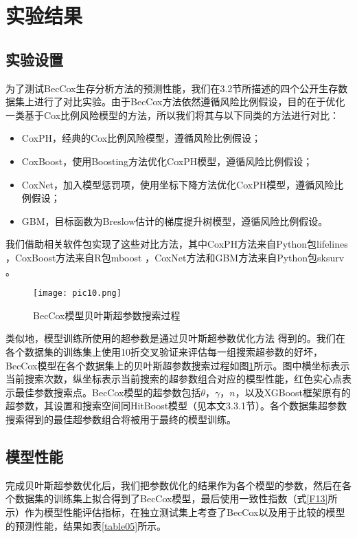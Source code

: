 \section{实验结果}

\subsection{实验设置}

为了测试BecCox生存分析方法的预测性能，我们在3.2节所描述的四个公开生存数据集上进行了对比实验。由于BecCox方法依然遵循风险比例假设，目的在于优化一类基于Cox比例风险模型的方法，所以我们将其与以下同类的方法进行对比：
\begin{itemize}
  \item CoxPH，经典的Cox比例风险模型，遵循风险比例假设；
  \item CoxBoost，使用Boosting方法优化CoxPH模型，遵循风险比例假设；
  \item CoxNet，加入模型惩罚项，使用坐标下降方法优化CoxPH模型，遵循风险比例假设；
  \item GBM，目标函数为Breslow估计的梯度提升树模型，遵循风险比例假设。
\end{itemize}
我们借助相关软件包实现了这些对比方法，其中CoxPH方法来自Python包lifelines ，CoxBoost方法来自R包mboost ，CoxNet方法和GBM方法来自Python包sksurv 。

\begin{figure}[H]
\texttt{[image: pic10.png]}
\caption{BecCox模型贝叶斯超参数搜索过程}
\label{pic10}
\end{figure}

类似地，模型训练所使用的超参数是通过贝叶斯超参数优化方法 得到的。我们在各个数据集的训练集上使用10折交叉验证来评估每一组搜索超参数的好坏，BecCox模型在各个数据集上的贝叶斯超参数搜索过程如图\ref{pic10}所示。图中横坐标表示当前搜索次数，纵坐标表示当前搜索的超参数组合对应的模型性能，红色实心点表示最佳参数搜索点。BecCox模型的超参数包括$\theta$，$\gamma$，$n$，以及XGBoost框架原有的超参数，其设置和搜索空间同HitBoost模型（见本文3.3.1节）。各个数据集超参数搜索得到的最佳超参数组合将被用于最终的模型训练。

\subsection{模型性能}

完成贝叶斯超参数优化后，我们把参数优化的结果作为各个模型的参数，然后在各个数据集的训练集上拟合得到了BecCox模型，最后使用一致性指数（式\eqref{F13}所示）作为模型性能评估指标，在独立测试集上考查了BecCox以及用于比较的模型的预测性能，结果如表\ref{table05}所示。

